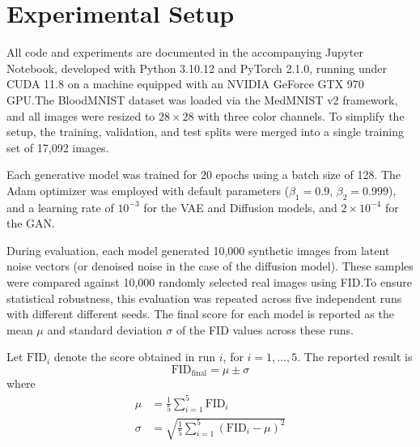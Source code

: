\section{Experimental Setup}

All code and experiments are documented in the accompanying Jupyter Notebook, developed with Python 3.10.12 and PyTorch 2.1.0, running under CUDA 11.8 on a machine equipped with an NVIDIA GeForce GTX 970 GPU.\@ The BloodMNIST dataset was loaded via the MedMNIST v2 framework, and all images were resized to $28 \times 28$ with three color channels. To simplify the setup, the training, validation, and test splits were merged into a single training set of 17,092 images.

Each generative model was trained for 20 epochs using a batch size of 128. The Adam optimizer was employed with default parameters ($\beta_1=0.9$, $\beta_2=0.999$), and a learning rate of $10^{-3}$ for the VAE and Diffusion models, and $2\times10^{-4}$ for the GAN.\@

During evaluation, each model generated 10,000 synthetic images from latent noise vectors (or denoised noise in the case of the diffusion model). These samples were compared against 10,000 randomly selected real images using FID.\@ To ensure statistical robustness, this evaluation was repeated across five independent runs with different different seeds. The final score for each model is reported as the mean $\mu$ and standard deviation $\sigma$ of the FID values across these runs.

Let $\text{FID}_i$ denote the score obtained in run $i$, for $i = 1, \dots, 5$. The reported result is 
\begin{equation}
    \text{FID}_{\text{final}} = \mu \pm \sigma
\end{equation}
where
\begin{align}
    \mu &= \frac{1}{5} \sum_{i=1}^5 \text{FID}_i \\
    \sigma &= \sqrt{\frac{1}{5} \sum_{i=1}^5 {\left(\text{FID}_i - \mu\right)}^2}
\end{align}
